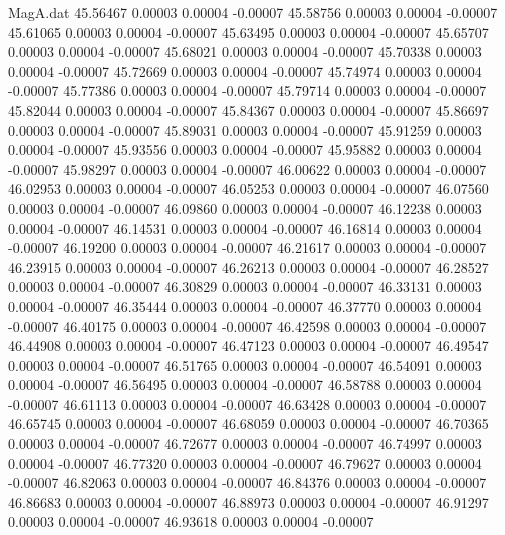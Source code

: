 \begin{filecontents}{MagA.dat}
  45.56467    0.00003    0.00004   -0.00007
  45.58756    0.00003    0.00004   -0.00007
  45.61065    0.00003    0.00004   -0.00007
  45.63495    0.00003    0.00004   -0.00007
  45.65707    0.00003    0.00004   -0.00007
  45.68021    0.00003    0.00004   -0.00007
  45.70338    0.00003    0.00004   -0.00007
  45.72669    0.00003    0.00004   -0.00007
  45.74974    0.00003    0.00004   -0.00007
  45.77386    0.00003    0.00004   -0.00007
  45.79714    0.00003    0.00004   -0.00007
  45.82044    0.00003    0.00004   -0.00007
  45.84367    0.00003    0.00004   -0.00007
  45.86697    0.00003    0.00004   -0.00007
  45.89031    0.00003    0.00004   -0.00007
  45.91259    0.00003    0.00004   -0.00007
  45.93556    0.00003    0.00004   -0.00007
  45.95882    0.00003    0.00004   -0.00007
  45.98297    0.00003    0.00004   -0.00007
  46.00622    0.00003    0.00004   -0.00007
  46.02953    0.00003    0.00004   -0.00007
  46.05253    0.00003    0.00004   -0.00007
  46.07560    0.00003    0.00004   -0.00007
  46.09860    0.00003    0.00004   -0.00007
  46.12238    0.00003    0.00004   -0.00007
  46.14531    0.00003    0.00004   -0.00007
  46.16814    0.00003    0.00004   -0.00007
  46.19200    0.00003    0.00004   -0.00007
  46.21617    0.00003    0.00004   -0.00007
  46.23915    0.00003    0.00004   -0.00007
  46.26213    0.00003    0.00004   -0.00007
  46.28527    0.00003    0.00004   -0.00007
  46.30829    0.00003    0.00004   -0.00007
  46.33131    0.00003    0.00004   -0.00007
  46.35444    0.00003    0.00004   -0.00007
  46.37770    0.00003    0.00004   -0.00007
  46.40175    0.00003    0.00004   -0.00007
  46.42598    0.00003    0.00004   -0.00007
  46.44908    0.00003    0.00004   -0.00007
  46.47123    0.00003    0.00004   -0.00007
  46.49547    0.00003    0.00004   -0.00007
  46.51765    0.00003    0.00004   -0.00007
  46.54091    0.00003    0.00004   -0.00007
  46.56495    0.00003    0.00004   -0.00007
  46.58788    0.00003    0.00004   -0.00007
  46.61113    0.00003    0.00004   -0.00007
  46.63428    0.00003    0.00004   -0.00007
  46.65745    0.00003    0.00004   -0.00007
  46.68059    0.00003    0.00004   -0.00007
  46.70365    0.00003    0.00004   -0.00007
  46.72677    0.00003    0.00004   -0.00007
  46.74997    0.00003    0.00004   -0.00007
  46.77320    0.00003    0.00004   -0.00007
  46.79627    0.00003    0.00004   -0.00007
  46.82063    0.00003    0.00004   -0.00007
  46.84376    0.00003    0.00004   -0.00007
  46.86683    0.00003    0.00004   -0.00007
  46.88973    0.00003    0.00004   -0.00007
  46.91297    0.00003    0.00004   -0.00007
  46.93618    0.00003    0.00004   -0.00007

\end{filecontents}

